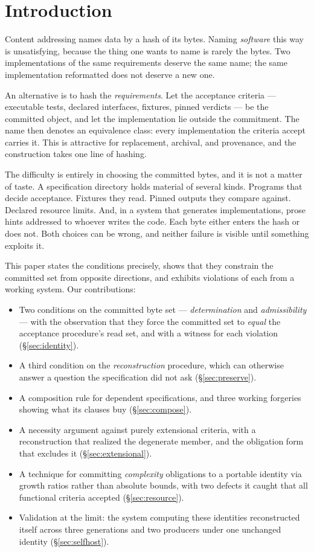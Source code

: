 \documentclass[10pt,twocolumn,letterpaper]{article}
\begin{document}
\section{Introduction}
Content addressing names data by a hash of its bytes. Naming \emph{software} this way is unsatisfying, because the thing one wants to name is rarely the bytes. Two implementations of the same requirements deserve the same name; the same implementation reformatted does not deserve a new one.

An alternative is to hash the \emph{requirements}. Let the acceptance criteria --- executable tests, declared interfaces, fixtures, pinned verdicts --- be the committed object, and let the implementation lie outside the commitment. The name then denotes an equivalence class: every implementation the criteria accept carries it. This is attractive for replacement, archival, and provenance, and the construction takes one line of hashing.

The difficulty is entirely in choosing the committed bytes, and it is not a matter of taste. A specification directory holds material of several kinds. Programs that decide acceptance. Fixtures they read. Pinned outputs they compare against. Declared resource limits. And, in a system that generates implementations, prose hints addressed to whoever writes the code. Each byte either enters the hash or does not. Both choices can be wrong, and neither failure is visible until something exploits it.

This paper states the conditions precisely, shows that they constrain the committed set from opposite directions, and exhibits violations of each from a working system. Our contributions:

\begin{itemize}\itemsep1pt\parskip0pt
\item Two conditions on the committed byte set --- \emph{determination} and \emph{admissibility} --- with the observation that they force the committed set to \emph{equal} the acceptance procedure's read set, and with a witness for each violation (§\ref{sec:identity}).
\item A third condition on the \emph{reconstruction} procedure, which can otherwise answer a question the specification did not ask (§\ref{sec:preserve}).
\item A composition rule for dependent specifications, and three working forgeries showing what its clauses buy (§\ref{sec:compose}).
\item A necessity argument against purely extensional criteria, with a reconstruction that realized the degenerate member, and the obligation form that excludes it (§\ref{sec:extensional}).
\item A technique for committing \emph{complexity} obligations to a portable identity via growth ratios rather than absolute bounds, with two defects it caught that all functional criteria accepted (§\ref{sec:resource}).
\item Validation at the limit: the system computing these identities reconstructed itself across three generations and two producers under one unchanged identity (§\ref{sec:selfhost}).
\end{itemize}
\end{document}
